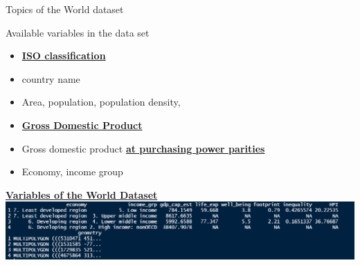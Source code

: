 \documentclass[
  ignorenonframetext,
]{beamer}
\providecommand{\tightlist}{%
  \setlength{\itemsep}{0pt}\setlength{\parskip}{0pt}}
\begin{document}
\begin{frame}{Topics of the World dataset}
\protect\hypertarget{topics-of-the-world-dataset}{}
\begin{block}{Available variables in the data set}
\protect\hypertarget{available-variables-in-the-data-set}{}
\begin{itemize}
\tightlist
\item
  \href{http://userpage.chemie.fu-berlin.de/diverse/doc/ISO_3166.html}{\textbf{ISO
  classification}}
\item
  country name
\item
  Area, population, population density,
\item
  \href{https://en.wikipedia.org/wiki/Gross_domestic_product}{\textbf{Gross
  Domestic Product}}
\item
  Gross domestic product
  \href{https://en.wikipedia.org/wiki/List_of_countries_by_GDP_\%28PPP\%29_per_capita}{\textbf{at
  purchasing power parities}}
\item
  Economy, income group
\end{itemize}
\end{block}

\begin{block}{\href{http://rpubs.com/Japhilko82/tmap_europe_dataset}{\textbf{Variables
of the World Dataset}}}
\protect\hypertarget{variables-of-the-world-dataset}{}
\includegraphics{pics/world_dataset.PNG}
\end{block}
\end{frame}
\end{document}
